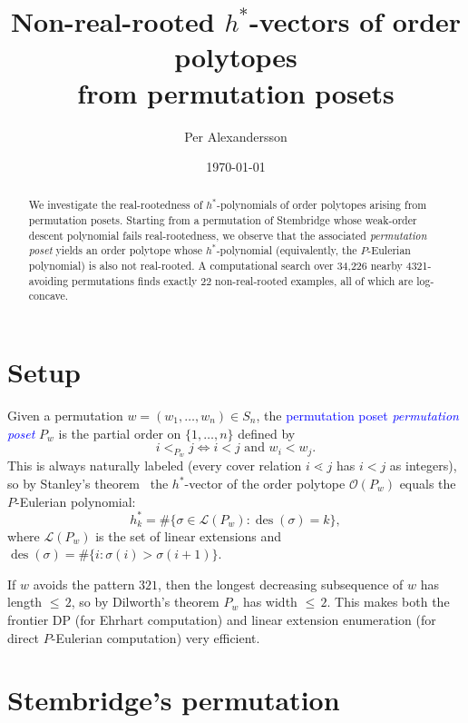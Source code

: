 \documentclass[11pt,reqno]{amsart}
\title{Non-real-rooted $h^*$-vectors of order polytopes\\from permutation posets}
\author{Per Alexandersson}
\date{\today}
\theoremstyle{definition}
\newcommand{\defin}[1]{%
\relax\ifmmode%
\textcolor{blue}{#1}%
\else \textcolor{blue}{\emph{#1}}%
\fi%
}
\begin{document}
\begin{abstract}
We investigate the real-rootedness of $h^*$-polynomials of
order polytopes arising from permutation posets.
Starting from a permutation of Stembridge whose weak-order
descent polynomial fails real-rootedness, we observe that
the associated \emph{permutation poset} yields an order polytope
whose $h^*$-polynomial (equivalently, the $P$-Eulerian polynomial)
is also not real-rooted.
A computational search over 34{,}226 nearby 4321-avoiding
permutations finds exactly 22 non-real-rooted examples,
all of which are log-concave.
\end{abstract}

\maketitle


\section{Setup}\label{sec:setup}

Given a permutation $w = (w_1, \dotsc, w_n) \in S_n$, the
\defin{permutation poset} $P_w$ is the partial order on $\{1,\dotsc,n\}$
defined by
\[
  i <_{P_w} j \iff i < j \text{ and } w_i < w_j.
\]
This is always naturally labeled (every cover relation $i \lessdot j$
has $i < j$ as integers), so by Stanley's theorem~\cite[Thm.~4.5.14]{StanleyEC1}
the $h^*$-vector of the order polytope $\mathcal{O}(P_w)$ equals the
$P$-Eulerian polynomial:
\[
  h^*_k = \#\bigl\{\sigma \in \mathcal{L}(P_w) : \operatorname{des}(\sigma) = k\bigr\},
\]
where $\mathcal{L}(P_w)$ is the set of linear extensions and
$\operatorname{des}(\sigma) = \#\{i : \sigma(i) > \sigma(i+1)\}$.

If $w$ avoids the pattern $321$, then the longest decreasing
subsequence of $w$ has length ${\leq}\,2$, so by Dilworth's theorem
$P_w$ has width ${\leq}\,2$.  This makes both the frontier DP
(for Ehrhart computation) and linear extension enumeration
(for direct $P$-Eulerian computation) very efficient.


\section{Stembridge's permutation}\label{sec:stembridge}
\end{document}
